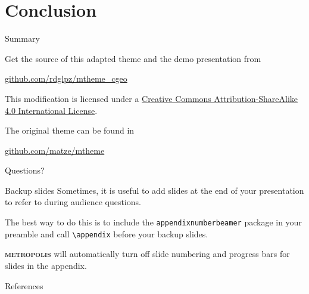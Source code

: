 \documentclass[10pt]{beamer}
\newcommand{\themename}{\textbf{\textsc{metropolis}}\xspace}
\begin{document}
\section{Conclusion}

\begin{frame}{Summary}

  Get the source of this adapted theme and the demo presentation from
	\begin{center}\url{github.com/rdglpz/mtheme_cgeo}\end{center}
  

  This modification is licensed under a
  \href{http://creativecommons.org/licenses/by-sa/4.0/}{Creative Commons
  Attribution-ShareAlike 4.0 International License}.

The original theme can be found in 
\begin{center}\url{github.com/matze/mtheme}\end{center}

  \begin{center}\ccbysa\end{center}

\end{frame}

{
\begin{frame}[standout]
  Questions?
\end{frame}
}

\appendix

\begin{frame}[fragile]{Backup slides}
  Sometimes, it is useful to add slides at the end of your presentation to
  refer to during audience questions.

  The best way to do this is to include the \verb|appendixnumberbeamer|
  package in your preamble and call \verb|\appendix| before your backup slides.

  \themename will automatically turn off slide numbering and progress bars for
  slides in the appendix.
\end{frame}

\begin{frame}[allowframebreaks]{References}

  
  

\end{frame}
\end{document}
